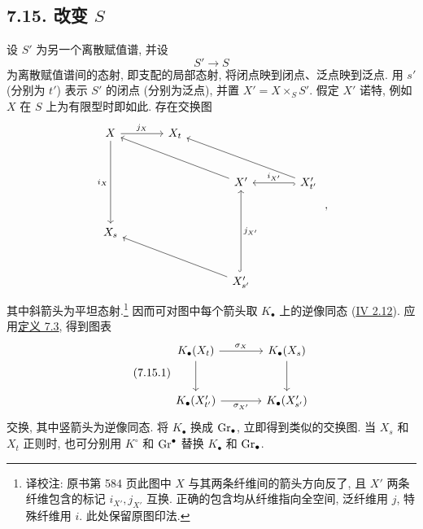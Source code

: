 \subsection*{7.15. 改变 $S$} 设 $S'$ 为另一个离散赋值谱, 并设
%
\[
S'\longrightarrow S
\]
为离散赋值谱间的态射, 即支配的局部态射, 将闭点映到闭点、泛点映到泛点. 用 $s'$ (分别为 $t'$) 表示 $S'$ 的闭点 (分别为泛点), 并置 $X'=X\times_SS'$. 假定 $X'$ 诺特, 例如 $X$ 在 $S$ 上为有限型时即如此. 存在交换图
%
%
%
%
%
\[
\begin{tikzcd}[column sep=large,row sep=large]
X \arrow[r,"j_X"] \arrow[dd,"i_X"'] & X_t & & \\
& & X' \arrow[ull] & X'_{t'} \arrow[l,hook,"i_{X'}"'] \arrow[ull] \\
X_s & & & \\
& & X'_{s'} \arrow[uu,hook,"j_{X'}"'] \arrow[ull] &
\end{tikzcd}
\;,
\]
其中斜箭头为平坦态射.\footnote{译校注: 原书第 584 页此图中 $X$ 与其两条纤维间的箭头方向反了, 且 $X'$ 两条纤维包含的标记 $i_{X'},j_{X'}$ 互换. 正确的包含均从纤维指向全空间, 泛纤维用 $j$, 特殊纤维用 $i$. 此处保留原图印法.} 因而可对图中每个箭头取 $K_\bullet$ 上的逆像同态 (\hyperlink{sga6.e04.para.2-12}{IV 2.12}). 应用\hyperlink{sga6.e10.prop.7-3}{定义 7.3}, 得到图表
%
%
\begin{equation}\tag{7.15.1}
\begin{tikzcd}[column sep=large,row sep=large]
K_\bullet(X_t) \arrow[r,"\sigma_X"] \arrow[d] &
K_\bullet(X_s) \arrow[d]\\
K_\bullet(X'_{t'}) \arrow[r,"\sigma_{X'}"'] &
K_\bullet(X'_{s'})
\end{tikzcd}
\end{equation}
交换, 其中竖箭头为逆像同态. 将 $K_\bullet$ 换成 $\operatorname{Gr}_\bullet$, 立即得到类似的交换图. 当 $X_s$ 和 $X_t$ 正则时, 也可分别用 $K^\circ$ 和 $\operatorname{Gr}^\bullet$ 替换 $K_\bullet$ 和 $\operatorname{Gr}_\bullet$.
%
%
%
%



